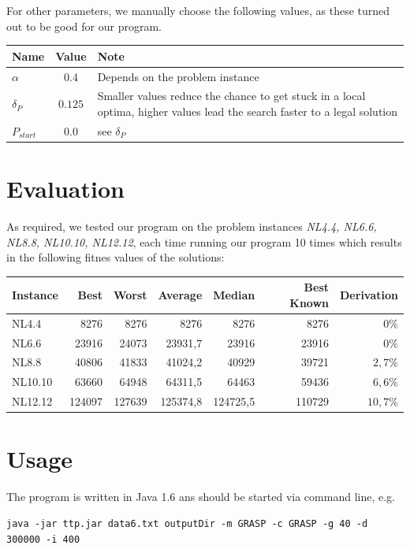 \documentclass[a4paper,11pt]{article}
\begin{document}
For other parameters, we manually choose the following values, as these turned out to be good for our program.
\begin{center}
\begin{tabularx}{\linewidth}{| l | c | X | }
  \hline                       
  Name & Value & Note \\   \hline     \hline    
  $\alpha$ & $0.4$ & Depends on the problem instance \\ \hline    
  $ \delta_P $ & $ 0.125 $ & Smaller values reduce the chance to get stuck in a local optima, higher values lead the search faster to a legal solution \\ \hline    
  $P_{start}$ & $0.0$ & see $ \delta_P $ \\ \hline    
\end{tabularx}
\end{center}

\section{Evaluation}
As required, we tested our program on the problem instances 
\emph{NL4.4, NL6.6, NL8.8, NL10.10, NL12.12},
 each time running our program 10 times which results in the following fitnes values of the
solutions:

\begin{center}
\begin{tabular}{| l | r | r | r | r ||r | r |}
  \hline                       
  Instance& Best & Worst & Average & Median & Best Known & Derivation\\   \hline     \hline    
  NL4.4 & 8276 & 8276 & 8276 & 8276 & 8276  &  0$\%$ \\ \hline    
  NL6.6 & 23916 & 24073 & 23931,7 & 23916& 23916 &  0$\%$\\ \hline   
  NL8.8 &  40806 &41833 & 41024,2 & 40929 & 39721 & $2,7\%$\\ \hline  
  NL10.10 & 63660  &  64948 & 64311,5 & 64463 & 59436 & $6,6\%$\\ \hline 
  NL12.12 & 124097  & 127639& 125374,8 & 124725,5 & 110729 & $10,7\%$ \\ \hline
\end{tabular}
\end{center}

\section{Usage}
The program is written in Java 1.6 ans should be started via command line, e.g.
\small
\lstset{language=sh}
\begin{lstlisting}
java -jar ttp.jar data6.txt outputDir -m GRASP -c GRASP -g 40 -d 300000 -i 400
\end{lstlisting}
\end{document}
